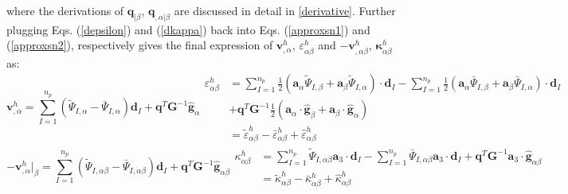 where the derivations of $\boldsymbol q_{\vert \beta}$, $\boldsymbol q_{,\alpha\vert\beta}$ are discussed in detail in \ref{derivative}. Further plugging Eqs. (\ref{depsilon}) and (\ref{dkappa}) back into Eqs. (\ref{approxsn1}) and (\ref{approxsn2}), respectively gives the final expression of $\boldsymbol v^h_{,\alpha}$, $\varepsilon^h_{\alpha\beta}$ and $-\boldsymbol v^h_{,\alpha\beta}$, $\boldsymbol \kappa^h_{\alpha\beta}$ as: \begin{subequations}
\begin{equation}
\boldsymbol v^h_{,\alpha} = \sum_{I=1}^{n_p}(
\tilde \Psi_{I,\alpha} - \bar \Psi_{I,\alpha}) \boldsymbol d_I +
\boldsymbol q^T \boldsymbol G^{-1}\hat{\boldsymbol g}_{\alpha}
\end{equation}
\begin{equation}\label{epsilonh}
\begin{split}
\varepsilon^h_{\alpha\beta} &= 
\sum_{I=1}^{n_p} \frac{1}{2}(\boldsymbol a_\alpha \tilde \Psi_{I,\beta} + \boldsymbol a_\beta \tilde \Psi_{I,\alpha}) \cdot \boldsymbol d_I 
- \sum_{I=1}^{n_p} \frac{1}{2}(\boldsymbol a_\alpha \bar \Psi_{I,\beta} + \boldsymbol a_\beta \bar \Psi_{I,\alpha}) \cdot \boldsymbol d_I \\
&+ \boldsymbol q^T \boldsymbol G^{-1} \frac{1}{2}(\boldsymbol a_\alpha \cdot \hat{\boldsymbol g}_{\beta} + \boldsymbol a_\beta \cdot \hat{\boldsymbol g}_{\alpha}) \\
&= \tilde \varepsilon^h_{\alpha\beta} - \bar \varepsilon^h_{\alpha\beta} + \hat \varepsilon^h_{\alpha\beta}
\end{split}
\end{equation}
\end{subequations}
\begin{subequations}
\begin{equation}
-\boldsymbol v^h_{,\alpha}\vert_\beta = \sum_{I=1}^{n_p} (
\tilde \Psi_{I,\alpha\beta} -
\bar \Psi_{I,\alpha\beta} ) \boldsymbol d_I +
\boldsymbol q^T \boldsymbol G^{-1}\hat{\boldsymbol g}_{\alpha\beta}
\end{equation}
\begin{equation}\label{kappah}
\begin{split}
\kappa^h_{\alpha\beta} &= \sum_{I=1}^{n_p} \tilde \Psi_{I,\alpha\beta} \boldsymbol a_3 \cdot \boldsymbol d_I
- \sum_{I=1}^{n_p} \bar \Psi_{I,\alpha\beta} \boldsymbol a_3 \cdot \boldsymbol d_I +
\boldsymbol q^T \boldsymbol G^{-1}\boldsymbol a_3 \cdot \hat{\boldsymbol g}_{\alpha\beta} \\
&= \tilde \kappa^h_{\alpha\beta} - \bar \kappa^h_{\alpha\beta} + \hat \kappa^h_{\alpha\beta}
\end{split}
\end{equation}
\end{subequations}
